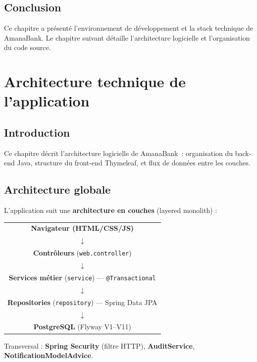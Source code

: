 \documentclass[11pt,a4paper,oneside]{report}
\newcommand{\nomapplication}{AmanaBank}
\begin{document}
\section{Conclusion}

Ce chapitre a présenté l'environnement de développement et la stack technique de \nomapplication. Le chapitre suivant détaille l'architecture logicielle et l'organisation du code source.

\chapter{Architecture technique de l'application}
\label{ch:archi}

\section{Introduction}

Ce chapitre décrit l'architecture logicielle de \nomapplication\ : organisation du back-end Java, structure du front-end Thymeleaf, et flux de données entre les couches.

\section{Architecture globale}

L'application suit une \textbf{architecture en couches} (layered monolith) :

\begin{center}
\begin{tabular}{c}
    \textbf{Navigateur (HTML/CSS/JS)} \\
    $\downarrow$ \\
    \textbf{Contrôleurs} (\texttt{web.controller}) \\
    $\downarrow$ \\
    \textbf{Services métier} (\texttt{service}) — \texttt{@Transactional} \\
    $\downarrow$ \\
    \textbf{Repositories} (\texttt{repository}) — Spring Data JPA \\
    $\downarrow$ \\
    \textbf{PostgreSQL} (Flyway V1--V11) \\
\end{tabular}
\end{center}

Transversal : \textbf{Spring Security} (filtre HTTP), \textbf{AuditService}, \textbf{NotificationModelAdvice}.
\end{document}
